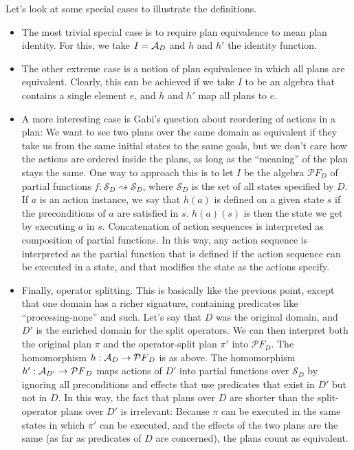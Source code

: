 Let's look at some special cases to illustrate the definitions.

\newcommand{\states}{{\mathcal S}}
\newcommand{\partialfunctions}{{\mathcal PF}}

\begin{itemize}
\item The most trivial special case is to require plan equivalence to
  mean plan identity.  For this, we take $I = {\mathcal A}_D$ and $h$ and $h'$
  the identity function.
\item The other extreme case is a notion of plan equivalence in which
  all plans are equivalent.  Clearly, this can be achieved if we take
  $I$ to be an algebra that contains a single element $e$, and $h$ and
  $h'$ map all plans to $e$.
\item A more interesting case is Gabi's question about reordering of
  actions in a plan: We want to see two plans over the same domain as
  equivalent if they take us from the same initial states to the same
  goals, but we don't care how the actions are ordered inside the
  plans, as long as the ``meaning'' of the plan stays the same.  One
  way to approach this is to let $I$  be the algebra
  $\partialfunctions_D$ of partial functions $f:\states_D
  \rightsquigarrow \states_D$, where $\states_D$ is the set of all
  states specified by $D$.  If $a$ is an action instance, we say that
  $h(a)$ is defined on a given state $s$ if the preconditions of $a$
  are satisfied in $s$.  $h(a)(s)$ is then the state we get by
  executing $a$ in $s$.  Concatenation of action sequences is
  interpreted as composition of partial functions.  In this way, any
  action sequence is interpreted as the partial function that is
  defined if the action sequence can be executed in a state, and that
  modifies the state as the actions specify.
\item Finally, operator splitting.  This is basically like the
  previous point, except that one domain has a richer signature,
  containing predicates like ``processing-none'' and such.  Let's say
  that $D$ was the original domain, and $D'$ is the enriched domain
  for the split operators.  We can then interpret both the original
  plan $\pi$ and the operator-split plan $\pi'$ into
  $\partialfunctions_{D}$.  The homomorphism $h:\A_D
  \rightarrow \partialfunctions_D$ is as above.  The homomorphism
  $h':\A_{D'} \rightarrow \partialfunctions_D$ maps actions of $D'$
  into partial functions over $\states_D$ by ignoring all
  preconditions and effects that use predicates that exist in $D'$ but
  not in $D$.  In this way, the fact that plans over $D$ are shorter
  than the split-operator plans over $D'$ is irrelevant: Because $\pi$
  can be executed in the same states in which $\pi'$ can be executed,
  and the effects of the two plans are the same (as far as predicates
  of $D$ are concerned), the plans count as equivalent.
\end{itemize}

